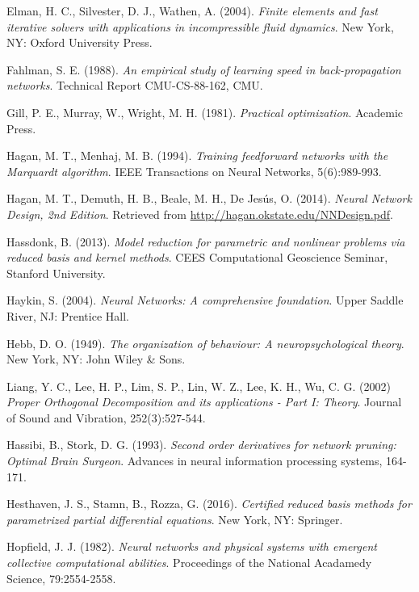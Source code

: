 \documentclass[12pt, a4paper, twoside, openright]{report}
\numberwithin{equation}{chapter}
\theoremstyle{theorem}
\theoremstyle{definition}
\theoremstyle{remark}
\theoremstyle{proposition}
\numberwithin{figure}{chapter}
\begin{document}
\begin{thebibliography}{50}
		Elman, H. C., Silvester, D. J., Wathen, A. (2004). \emph{Finite elements and fast iterative solvers with applications in incompressible fluid dynamics}. New York, NY: Oxford University Press.
		
		Fahlman, S. E. (1988). \emph{An empirical study of learning speed in back-propagation networks}. Technical Report CMU-CS-88-162, CMU.
		
		Gill, P. E., Murray, W., Wright, M. H. (1981). \emph{Practical optimization}. Academic Press.
		
		Hagan, M. T., Menhaj, M. B. (1994). \emph{Training feedforward networks with the Marquardt algorithm}. IEEE Transactions on Neural Networks, 5(6):989-993.
		
		Hagan, M. T., Demuth, H. B., Beale, M. H., De Jes\'us, O. (2014). \emph{Neural Network Design, 2nd Edition}. Retrieved from \url{http://hagan.okstate.edu/NNDesign.pdf}.
		
		Hassdonk, B. (2013). \emph{Model reduction for parametric and nonlinear problems via reduced basis and kernel methods}. CEES Computational Geoscience Seminar, Stanford University.
		
		Haykin, S. (2004). \emph{Neural Networks: A comprehensive foundation}. Upper Saddle River, NJ: Prentice Hall.
		
		Hebb, D. O. (1949). \emph{The organization of behaviour: A neuropsychological theory}. New York, NY: John Wiley \& Sons. 
		
		Liang, Y. C., Lee, H. P., Lim, S. P., Lin, W. Z., Lee, K. H., Wu, C. G. (2002) \emph{Proper Orthogonal Decomposition and its applications - Part I: Theory}. Journal of Sound and Vibration, 252(3):527-544.
		
		Hassibi, B., Stork, D. G. (1993). \emph{Second order derivatives for network pruning: Optimal Brain Surgeon}. Advances in neural information processing systems, 164-171.
		
		Hesthaven, J. S., Stamn, B., Rozza, G. (2016). \emph{Certified reduced basis methods for parametrized partial differential equations}. New York, NY: Springer.
		
		Hopfield, J. J. (1982). \emph{Neural networks and physical systems with emergent collective computational abilities}. Proceedings of the National Acadamedy Science, 79:2554-2558.
		

\end{thebibliography}
\end{document}
